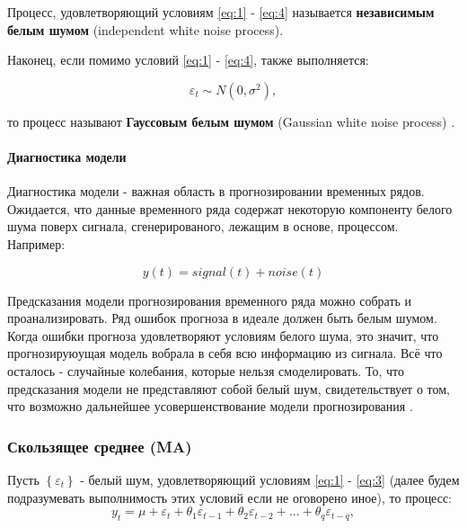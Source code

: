 Процесс, удовлетворяющий условиям \eqref{eq:1} - \eqref{eq:4} называется \textbf{независимым 
белым шумом} (independent white noise process).

Наконец, если помимо условий \eqref{eq:1} - \eqref{eq:4}, также выполняется:

\begin{equation*}
    \varepsilon_t \sim N(0, \sigma^2),
\end{equation*}

то процесс называют \textbf{Гауссовым белым шумом} (Gaussian white noise 
process) \cite{TSA_Hamilton}.

\paragraph{Диагностика модели}

Диагностика модели - важная область в прогнозировании временных рядов. 
Ожидается, что данные временного ряда содержат некоторую компоненту 
белого шума поверх сигнала, сгенерированого, лежащим в основе, процессом. 
Например: 

\begin{equation*}
    y(t) = signal(t) + noise(t)
\end{equation*}

Предсказания модели прогнозирования временного ряда можно собрать и 
проанализировать. Ряд ошибок прогноза в идеале должен быть белым шумом. 
Когда ошибки прогноза удовлетворяют условиям белого шума, это значит, 
что прогнозируюущая модель вобрала в себя всю информацию из сигнала. 
Всё что осталось - случайные колебания, которые нельзя смоделировать. 
То, что предсказания модели не представляют собой белый шум, 
свидетельствует о том, что возможно дальнейшее усовершенствование 
модели прогнозирования \cite{Forecasting_Brownlee}.

\subsubsection{Скользящее среднее (MA)}

Пусть $\left\{ \varepsilon_t \right\}$ - белый шум, удовлетворяющий условиям 
\eqref{eq:1} - \eqref{eq:3} (далее будем подразумевать выполнимость этих 
условий если не оговорено иное), то процесс:
\begin{equation*}
    y_t = \mu + \varepsilon_t + \theta_1 \varepsilon_{t-1} + 
    \theta_2 \varepsilon_{t-2} + ... + \theta_q \varepsilon_{t-q},
\end{equation*}

